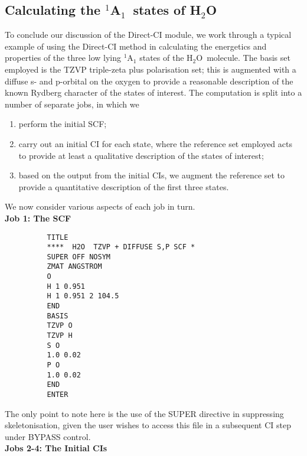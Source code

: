 \documentclass[11pt,fleqn]{article}
\newcommand{\water}{\mbox{H$_{2}$O}}
\newcommand{\astate}{\mbox{$^{1}$A$_{1}$}}
\begin{document}
\subsection[Calculating the \astate\ states of \water]{Calculating the \astate\ states of \water}

To conclude our discussion of the Direct-CI module, we work through
a typical example of using the Direct-CI method in calculating
the energetics and properties of the three low lying $^{1}$A$_{1}$
states of the \water\ molecule. The basis set employed is the
TZVP triple-zeta plus polarisation set; this is augmented
with a diffuse s- and p-orbital on the oxygen to provide
a reasonable description of the known Rydberg character of
the states of interest.
The computation is split into a number of separate jobs, in which we
\begin{enumerate}
\item perform the initial SCF;
\item carry out an initial CI for each state, 
where the reference set employed
acts to provide at least a qualitative description of the states
of interest;
\item based on the output from the initial CIs, we augment the
reference set to provide a quantitative description of the
first three states.
\end{enumerate}
We now consider various aspects of each job in turn.\\

{\bf Job 1: The SCF}
{
\footnotesize
\begin{verbatim}
          TITLE  
          ****  H2O  TZVP + DIFFUSE S,P SCF *
          SUPER OFF NOSYM
          ZMAT ANGSTROM
          O
          H 1 0.951
          H 1 0.951 2 104.5
          END
          BASIS 
          TZVP O
          TZVP H
          S O
          1.0 0.02
          P O
          1.0 0.02
          END
          ENTER
\end{verbatim}
}
The only point to note here is the use of the SUPER directive in
suppressing skeletonisation, given the user wishes to access this file
in a subsequent CI step under BYPASS control.\\

{\bf Jobs 2-4: The Initial CIs}\\
\end{document}
